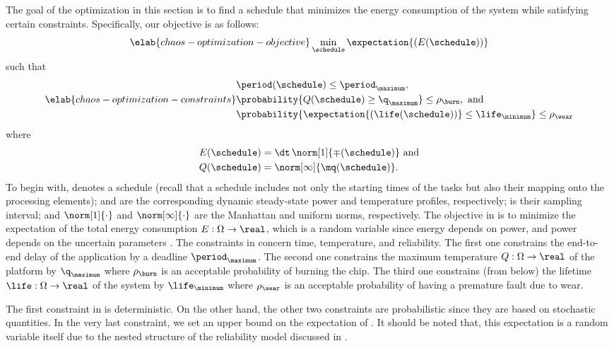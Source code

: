 The goal of the optimization in this section is to find a schedule that
minimizes the energy consumption of the system while satisfying certain
constraints. Specifically, our objective is as follows:
\begin{equation} \elab{chaos-optimization-objective}
  \min_{\schedule} \expectation{(E(\schedule))}
\end{equation}
such that
\begin{equation} \elab{chaos-optimization-constraints}
  \begin{split}
    & \period(\schedule) \leq \period_\maximum, \\
    & \probability{Q(\schedule) \geq \q_\maximum} \leq \rho_\burn, \text{ and} \\
    & \probability{\expectation{\left(\life(\schedule)\right)} \leq \life_\minimum} \leq \rho_\wear
  \end{split}
\end{equation}
where
\begin{align*}
  & E(\schedule) = \dt \, \norm[1]{\mp(\schedule)} \text{ and} \\
  & Q(\schedule) = \norm[\infty]{\mq(\schedule)}.
\end{align*}
To begin with, \schedule denotes a schedule (recall that a schedule includes not
only the starting times of the tasks but also their mapping onto the processing
elements); \mp and \mq are the corresponding dynamic steady-state power and
temperature profiles, respectively; \dt is their sampling interval; and
$\norm[1]{\cdot}$ and $\norm[\infty]{\cdot}$ are the Manhattan and uniform
norms, respectively. The objective in  is to
minimize the expectation of the total energy consumption $E: \Omega \to \real$,
which is a random variable since energy depends on power, and power depends on
the uncertain parameters \vu. The constraints in
 concern time, temperature, and
reliability. The first one constrains the end-to-end delay \period of the
application by a deadline $\period_\maximum$. The second one constrains the
maximum temperature $Q: \Omega \to \real$ of the platform by $\q_\maximum$ where
$\rho_\burn$ is an acceptable probability of burning the chip. The third one
constrains (from below) the lifetime $\life: \Omega \to \real$ of the system by
$\life_\minimum$ where $\rho_\wear$ is an acceptable probability of having a
premature fault due to wear.

The first constraint in  is deterministic.
On the other hand, the other two constraints are probabilistic since they are
based on stochastic quantities. In the very last constraint, we set an upper
bound on the expectation of \life. It should be noted that, this expectation is
a random variable itself due to the nested structure of the reliability model
discussed in .

